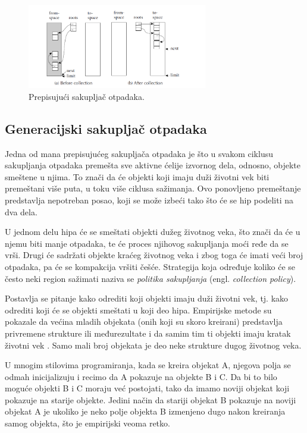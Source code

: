 \documentclass[a4paper]{article}
\begin{document}
\begin{figure}[h]
	\centering
	\includegraphics[width=0.7\textwidth]{copygc.png}
	\caption{Prepisujući sakupljač otpadaka.}
	\label{fig:copygc}
\end{figure}

\subsection{Generacijski sakupljač otpadaka}

Jedna od mana prepisujućeg sakupljača otpadaka je što u svakom ciklusu sakupljanja otpadaka premešta sve aktivne ćelije izvornog dela, odnosno, objekte smeštene u njima. To znači da će objekti koji imaju duži životni vek biti premeštani više puta, u toku više ciklusa sažimanja. Ovo ponovljeno premeštanje predstavlja nepotreban posao, koji se može izbeći tako što će se hip podeliti na dva dela.

U jednom delu hipa će se smeštati objekti dužeg životnog veka, što znači da će u njemu biti manje otpadaka, te će proces njihovog sakupljanja moći ređe da se vrši. Drugi će sadržati objekte kraćeg životnog veka i zbog toga će imati veći broj otpadaka, pa će se kompakcija vršiti češće. Strategija koja određuje koliko će se često neki region sažimati naziva se \textit{politika sakupljanja} (engl. \textit{collection policy}).

Postavlja se pitanje kako odrediti koji objekti imaju duži životni vek, tj. kako odrediti koji će se objekti smeštati u koji deo hipa. Empirijske metode su pokazale da većina mladih objekata (onih koji su skoro kreirani) predstavlja privremene strukture ili međurezultate i da samim tim ti objekti imaju kratak životni vek \cite{app87}. Samo mali broj objekata je deo neke strukture dugog životnog veka.

U mnogim stilovima programiranja, kada se kreira objekat A, njegova polja se odmah inicijalizuju i recimo da A pokazuje na objekte B i C. Da bi to bilo moguće objekti B i C moraju već postojati, tako da imamo noviji objekat koji pokazuje na starije objekte. Jedini način da stariji objekat B pokazuje na noviji objekat A je ukoliko je neko polje objekta B izmenjeno dugo nakon kreiranja samog objekta, što je empirijski veoma retko.
\end{document}
